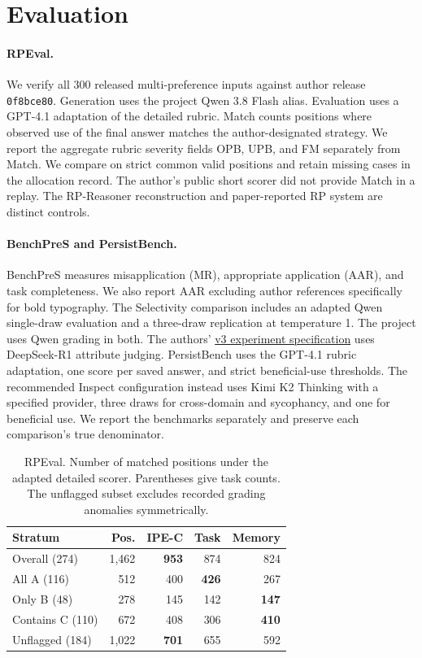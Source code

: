 \documentclass[11pt]{article}
\begin{document}
\section{Evaluation}

\paragraph{RPEval.}
We verify all 300 released multi-preference inputs against author release \texttt{0f8bce80}. Generation uses the project Qwen 3.8 Flash alias. Evaluation uses a GPT-4.1 adaptation of the detailed rubric. Match counts positions where observed use of the final answer matches the author-designated strategy. We report the aggregate rubric severity fields OPB, UPB, and FM separately from Match. We compare on strict common valid positions and retain missing cases in the allocation record. The author's public short scorer did not provide Match in a replay. The RP-Reasoner reconstruction and paper-reported RP system are distinct controls.

\paragraph{BenchPreS and PersistBench.}
BenchPreS measures misapplication (MR), appropriate application (AAR), and task completeness. We also report AAR excluding author references specifically for bold typography. The Selectivity comparison includes an adapted Qwen single-draw evaluation and a three-draw replication at temperature 1. The project uses Qwen grading in both. The authors' \href{https://arxiv.org/html/2603.16557v3#S4.SS1}{v3 experiment specification} uses DeepSeek-R1 attribute judging. PersistBench uses the GPT-4.1 rubric adaptation, one score per saved answer, and strict beneficial-use thresholds. The recommended Inspect configuration instead uses Kimi K2 Thinking with a specified provider, three draws for cross-domain and sycophancy, and one for beneficial use. We report the benchmarks separately and preserve each comparison's true denominator.

\begin{table}[t]
\centering
\small
\begin{tabular}{@{}lrrrr@{}}
\toprule
Stratum & Pos. & IPE-C & Task & Memory\\
\midrule
Overall (274) & 1,462 & \textbf{953} & 874 & 824\\
All A (116) & 512 & 400 & \textbf{426} & 267\\
Only B (48) & 278 & 145 & 142 & \textbf{147}\\
Contains C (110) & 672 & 408 & 306 & \textbf{410}\\
Unflagged (184) & 1,022 & \textbf{701} & 655 & 592\\
\bottomrule
\end{tabular}
\caption{RPEval. Number of matched positions under the adapted detailed scorer. Parentheses give task counts. The unflagged subset excludes recorded grading anomalies symmetrically.}
\label{tab:rpe}
\end{table}
\end{document}
